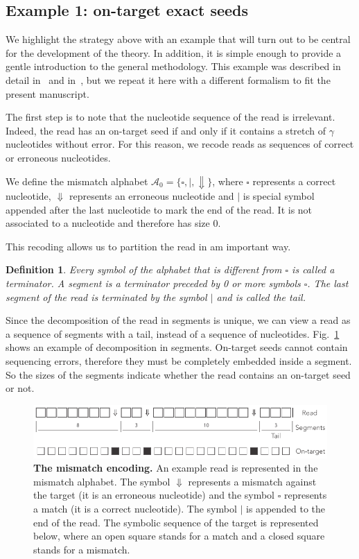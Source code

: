 \documentclass{article}
\newtheorem{definition}{Definition}
\begin{document}
\subsection{Example 1: on-target exact seeds}
\label{sec:example_exact}

We highlight the strategy above with an example that will turn out to be
central for the development of the theory. In addition, it is simple
enough to provide a gentle introduction to the general methodology. This
example was described in detail in~\cite{filion2017analytic} and
in~\cite{filion2018analytic}, but we repeat it here with a different
formalism to fit the present manuscript.

The first step is to note that the nucleotide sequence of the read is
irrelevant. Indeed, the read has an on-target seed if and only if it
contains a stretch of $\gamma$ nucleotides without error. For this reason,
we recode reads as sequences of correct or erroneous nucleotides.

We define the mismatch alphabet $\mathcal{A}_0 = \{\square, |,
\Downarrow\}$, where $\square$ represents a correct nucleotide,
$\Downarrow$ represents an erroneous nucleotide and $|$ is special symbol
appended after the last nucleotide to mark the end of the read. It is not
associated to a nucleotide and therefore has size 0.

This recoding allows us to partition the read in am important way.

\begin{definition}
\label{def:seg}
Every symbol of the alphabet that is different from $\square$ is called a
terminator. A segment is a terminator preceded by 0 or more symbols $\square$.
The last segment of the read is terminated by the symbol $|$ and is called the
tail.
\end{definition}

Since the decomposition of the read in segments is unique, we can view a
read as a sequence of segments with a tail, instead of a sequence of
nucleotides. Fig.~\ref{fig:simple} shows an example of decomposition in
segments. On-target seeds cannot contain sequencing errors, therefore they
must be completely embedded inside a segment. So the sizes of the segments
indicate whether the read contains an on-target seed or not.

\begin{figure}[h]
\centering
\includegraphics[scale=0.85]{sketch_simple.pdf}
\caption{\textbf{The mismatch encoding.}
An example read is represented in the mismatch alphabet. The symbol
$\Downarrow$ represents a mismatch against the target (it is an erroneous
nucleotide) and the symbol $\square$ represents a match (it is a correct
nucleotide). The symbol $|$ is appended to the end of the read. The
symbolic sequence of the target is represented below, where an open square
stands for a match and a closed square stands for a mismatch.}
\label{fig:simple}
\end{figure}
\end{document}

